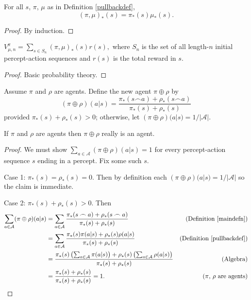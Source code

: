 \documentclass[runningheads]{llncs}
\begin{document}
\begin{lemma}
\label{factorizationlemma}
    For all $s$, $\pi$, $\mu$ as in Definition \ref{pullbackdef},
    \[
        (\pi,\mu)_*(s) = \pi_*(s)\mu_*(s).
    \]
\end{lemma}

\begin{proof}
    By induction.
\end{proof}

\begin{lemma}
\label{basicprobabilitylemma}
    $V^\pi_{\mu,n}=\sum_{s\in S_n}(\pi,\mu)_*(s)r(s),$
    where $S_n$ is the set of all length-$n$ initial
    percept-action sequences and $r(s)$ is the total reward in $s$.
\end{lemma}

\begin{proof}
    Basic probability theory.
\end{proof}

\begin{definition}
\label{maindefn}
    Assume $\pi$ and $\rho$ are agents.
    Define the new agent $\pi\oplus\rho$ by
    \[
        (\pi\oplus\rho)(a|s)
        =
        \frac{\pi_*(s\frown a) + \rho_*(s\frown a)}{\pi_*(s)+\rho_*(s)}
    \]
    provided $\pi_*(s)+\rho_*(s)>0$; otherwise,
    let $(\pi\oplus\rho)(a|s)=1/|\mathcal{A}|$.
\end{definition}

\begin{lemma}
    If $\pi$ and $\rho$ are agents then $\pi\oplus\rho$ really is an agent.
\end{lemma}

\begin{proof}
    We must show $\sum_{a\in\mathcal A}(\pi\oplus\rho)(a|s)=1$ for every
    percept-action sequence $s$ ending in a percept. Fix some such $s$.

    Case 1: $\pi_*(s)=\rho_*(s)=0$. Then by definition each
    $(\pi\oplus\rho)(a|s)=1/|\mathcal A|$ so the claim is immediate.

    Case 2: $\pi_*(s)+\rho_*(s)>0$. Then
    \begin{align*}
        \sum_{a\in\mathcal A}(\pi\oplus\rho)(a|s)
            &= \sum_{a\in\mathcal A}
                \frac{\pi_*(s\frown a)+\rho_*(s\frown a)}{\pi_*(s)+\rho_*(s)}
                &\mbox{(Definition \ref{maindefn})}\\
            &= \sum_{a\in\mathcal A}
                \frac{\pi_*(s)\pi(a|s)+\rho_*(s)\rho(a|s)}{\pi_*(s)+\rho_*(s)}
                &\mbox{(Definition \ref{pullbackdef})}\\
            &= \frac{
                \pi_*(s)\left(\mbox{$\sum_{a\in\mathcal A}\pi(a|s)$}\right)
                +
                \rho_*(s)\left(\mbox{$\sum_{a\in\mathcal A}\rho(a|s)$}\right)
                }{\pi_*(s)+\rho_*(s)}
                &\mbox{(Algebra)}\\
            &= \frac{\pi_*(s)+\rho_*(s)}{\pi_*(s)+\rho_*(s)}=1.
                &\mbox{($\pi$, $\rho$ are agents)}
    \end{align*}
\end{proof}
\end{document}
